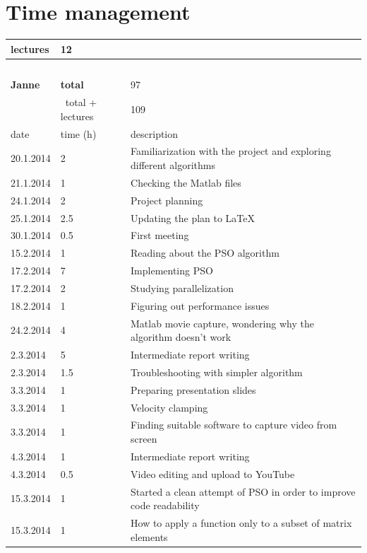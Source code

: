 \documentclass[twoside]{article}
\begin{document}
\section{Time management}
\begin{longtable}{ | l | l | p{10cm} | }
\hline
	lectures & 12 & \  \\ \hline
	\  & \  & \  \\ \hline
	\textbf{Janne} & \textbf{total} & 97 \\ \hline
	\ & \ total + lectures & 109  \\ \hline
	date & time (h) & description \\ \hline
	20.1.2014 & 2 & Familiarization with the project and exploring different algorithms \\ \hline
	21.1.2014 & 1 & Checking the Matlab files \\ \hline
	24.1.2014 & 2 & Project planning \\ \hline
	25.1.2014 & 2.5 & Updating the plan to LaTeX \\ \hline
	30.1.2014 & 0.5 & First meeting \\ \hline
	15.2.2014 & 1 & Reading about the PSO algorithm \\ \hline
	17.2.2014 & 7 & Implementing PSO \\ \hline
	17.2.2014 & 2 & Studying parallelization \\ \hline
	18.2.2014 & 1 & Figuring out performance issues \\ \hline
	24.2.2014 & 4 & Matlab movie capture, wondering why the algorithm doesn't work \\ \hline
	2.3.2014 & 5 & Intermediate report writing \\ \hline
	2.3.2014 & 1.5 & Troubleshooting with simpler algorithm \\ \hline
	3.3.2014 & 1 & Preparing presentation slides \\ \hline
	3.3.2014 & 1 & Velocity clamping \\ \hline
	3.3.2014 & 1 & Finding suitable software to capture video from screen \\ \hline
	4.3.2014 & 1 & Intermediate report writing \\ \hline
	4.3.2014 & 0.5 & Video editing and upload to YouTube \\ \hline
	15.3.2014 & 1 & Started a clean attempt of PSO in order to improve code readability \\ \hline
	15.3.2014 & 1 & How  to apply a function only to a subset of matrix elements \\ \hline

\end{longtable}
\end{document}
